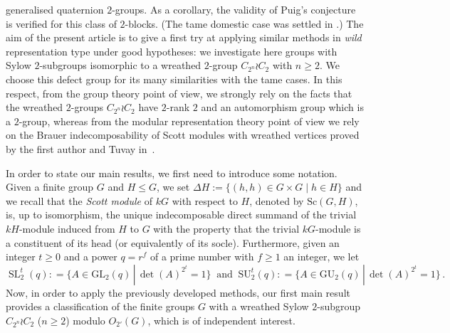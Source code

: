 \documentclass[12pt,a4paper]{amsart}
\theoremstyle{plain}\newtheorem{Theorem}{Theorem}[section]
\theoremstyle{plain}\newtheorem{Conjecture}[Theorem]{Conjecture}
\theoremstyle{plain}\newtheorem{Corollary}[Theorem]{Corollary}
\theoremstyle{plain}\newtheorem{Lemma}[Theorem]{Lemma}
\theoremstyle{plain}\newtheorem{Proposition}[Theorem]{Proposition}
\theoremstyle{definition}\newtheorem{Definition}[Theorem]{Definition}
\theoremstyle{definition}\newtheorem{Example}[Theorem]{Example}
\theoremstyle{definition}\newtheorem{Examples}[Theorem]{Examples}
\theoremstyle{definition}\newtheorem{Remark}[Theorem]{Remark}
\theoremstyle{definition}\newtheorem{Question}[Theorem]{Question}
\theoremstyle{definition}\newtheorem{Notation}[Theorem]{Notation}
\theoremstyle{definition}\newtheorem{Hypothesis}[Theorem]{Hypothesis}
\theoremstyle{definition}\newtheorem{Assumption}[Theorem]{Assumption}
\theoremstyle{definition}\newtheorem{Strategy}[Theorem]{Strategy}
\theoremstyle{definition}\newtheorem{Contents}[Theorem]{Contents}
\theoremstyle{definition}\newtheorem{Computations}[Theorem]{Computations}
\theoremstyle{definition}\newtheorem{Equivalences}[Theorem]{Equivalences}
\theoremstyle{definition}\newtheorem{Notation/Definition}[Theorem]{Notation/Definition}
\theoremstyle{definition}\newtheorem{noth}[Theorem]{}
\theoremstyle{plain}\newtheorem{Step}[Theorem]{Step}
\newcommand{\SL}{\operatorname{SL}}
\newcommand{\Sc}{{\text{Sc}}}
\begin{document}
generalised quaternion $2$-groups. As a corollary, the validity of 
Puig's conjecture is verified for this class of $2$-blocks. 
(The tame domestic case was settled in \cite{CEKL11}.) 
The aim of the present article is to give a first try at applying similar methods 
in {\it wild} representation type under good hypotheses: 
we investigate here groups with Sylow $2$-subgroups isomorphic to 
a wreathed $2$-group $C_{2^n}\wr C_2$ with $n\geq 2$.  
We choose this defect group for its many similarities with the tame cases. 
In this respect, from the group theory point of view,  we strongly rely on the 
facts that the wreathed $2$-groups $C_{2^n}\wr C_2$ have $2$-rank $2$ 
and an automorphism group which is a $2$-group, whereas from the modular 
representation theory point of view we rely on the Brauer indecomposability 
of Scott modules with wreathed vertices proved by the first author and Tuvay in~\cite{KT20}.  
\par
In order to state our main results, we first need to introduce some notation.  
Given a finite group $G$ and $H\leq G$,  we set $\Delta H:=\{(h,h)\in G\times G\mid h\in H\}$ 
and we recall that the \emph{Scott module} of $kG$ with respect to $H$, 
denoted  by $\Sc(G,H)$, is, up to isomorphism, the unique indecomposable direct summand of 
the trivial $kH$-module induced from $H$ to $G$ with the property that the trivial 
$kG$-module is a constituent of its head (or equivalently of its socle). Furthermore, 
given an integer $t\geq 0$ and a power $q=r^{f}$ of a prime number with $f\geq 1$ an integer, we let 
$$ \SL^t_2(q):
=\{A\in{\mathrm{GL}}_2(q)\,|\,\det(A)^{2^t}=1 \} \
 \text{ and } \ {\mathrm{SU}}^t_2(q):
=\{A\in{\mathrm{GU}}_2(q)\,|\, \det(A)^{2^t}=1 \}\,.$$
Now, in order to apply the previously developed methods, our 
first main result provides a classification 
of the finite groups $G$ with a wreathed Sylow $2$-subgroup $C_{2^n}\wr C_2$ ($n\geq 2$) 
modulo $O_{2'}(G)$, which is of independent interest.
\end{document}
